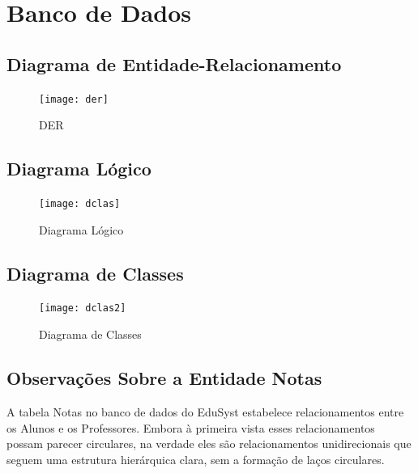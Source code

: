 \documentclass[main.tex]{subfiles}
\begin{document}

\section{Banco de Dados}

\subsection{Diagrama de Entidade-Relacionamento}
\begin{figure}[H]
    \centering
    \hspace*{-1.1cm} %
    \centering
    \texttt{[image: der]}
    \caption{DER}
\end{figure}

\subsection{Diagrama Lógico}
\begin{figure}[H]
    \centering
    \hspace*{-1.3cm} %
    \centering
    \texttt{[image: dclas]}
    \caption{Diagrama Lógico}
\end{figure}

\subsection{Diagrama de Classes}
\begin{figure}[H]
    \centering
    \vspace*{-0.5cm} %
    \hspace*{-2.72cm} %
    \centering
    \texttt{[image: dclas2]}
    \caption{Diagrama de Classes}
\end{figure}

\subsection{Observações Sobre a Entidade Notas}
A tabela Notas no banco de dados do EduSyst estabelece relacionamentos entre os Alunos e os Professores. Embora à primeira vista esses relacionamentos possam parecer circulares, na verdade eles são relacionamentos unidirecionais que seguem uma estrutura hierárquica clara, sem a formação de laços circulares.
\end{document}
